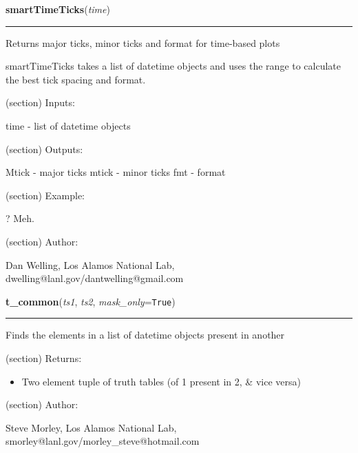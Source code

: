 \hspace{.8\funcindent}\begin{boxedminipage}{\funcwidth}

    \raggedright \textbf{smartTimeTicks}(\textit{time})

    \vspace{-1.5ex}

    \rule{\textwidth}{0.5\fboxrule}
\setlength{\parskip}{2ex}
    Returns major ticks, minor ticks and format for time-based plots

    smartTimeTicks takes a list of datetime objects and uses the range to 
    calculate the best tick spacing and format.

    (section) Inputs:

      time - list of datetime objects

    (section) Outputs:

      Mtick - major ticks mtick - minor ticks fmt - format

    (section) Example:

      ? Meh.

    (section) Author:

      Dan Welling, Los Alamos National Lab, 
      dwelling@lanl.gov/dantwelling@gmail.com

\setlength{\parskip}{1ex}
    \end{boxedminipage}

    \label{spacepy:toolbox:tCommon}

    \vspace{0.5ex}

\hspace{.8\funcindent}\begin{boxedminipage}{\funcwidth}

    \raggedright \textbf{t\_common}(\textit{ts1}, \textit{ts2}, \textit{mask\_only}={\tt True})

    \vspace{-1.5ex}

    \rule{\textwidth}{0.5\fboxrule}
\setlength{\parskip}{2ex}
    Finds the elements in a list of datetime objects present in another

    (section) Returns:

      \begin{itemize}
      \setlength{\parskip}{0.6ex}
        \item Two element tuple of truth tables (of 1 present in 2, \& vice 
          versa)

      \end{itemize}

    (section) Author:

      Steve Morley, Los Alamos National Lab, 
      smorley@lanl.gov/morley\_steve@hotmail.com

\setlength{\parskip}{1ex}
    \end{boxedminipage}

